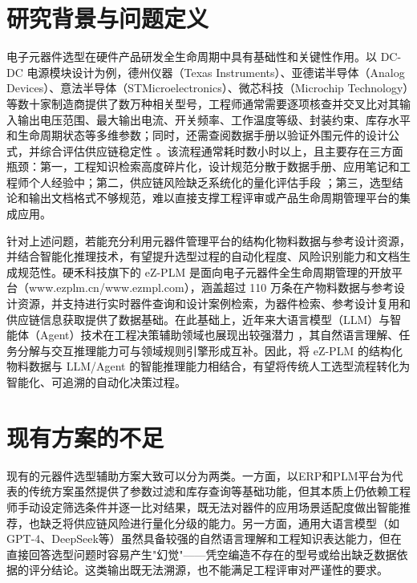 
\section{研究背景与问题定义}
电子元器件选型在硬件产品研发全生命周期中具有基础性和关键性作用。以 DC-DC 电源模块设计为例，德州仪器（Texas Instruments）、亚德诺半导体（Analog Devices）、意法半导体（STMicroelectronics）、微芯科技（Microchip Technology）等数十家制造商提供了数万种相关型号，工程师通常需要逐项核查并交叉比对其输入输出电压范围、最大输出电流、开关频率、工作温度等级、封装约束、库存水平和生命周期状态等多维参数；同时，还需查阅数据手册以验证外围元件的设计公式，并综合评估供应链稳定性 \cite{pecht2008parts}。该流程通常耗时数小时以上，且主要存在三方面瓶颈：第一，工程知识检索高度碎片化，设计规范分散于数据手册、应用笔记和工程师个人经验中；第二，供应链风险缺乏系统化的量化评估手段 \cite{chen2021supplyrisk}；第三，选型结论和输出文档格式不够规范，难以直接支撑工程评审或产品生命周期管理平台的集成应用。

针对上述问题，若能充分利用元器件管理平台的结构化物料数据与参考设计资源，并结合智能化推理技术，有望提升选型过程的自动化程度、风险识别能力和文档生成规范性。硬禾科技旗下的 eZ-PLM 是面向电子元器件全生命周期管理的开放平台（www.ezplm.cn/www.ezmpl.com），涵盖超过 110 万条在产物料数据与参考设计资源，并支持进行实时器件查询和设计案例检索，为器件检索、参考设计复用和供应链信息获取提供了数据基础。在此基础上，近年来大语言模型（LLM）与智能体（Agent）技术在工程决策辅助领域也展现出较强潜力 \cite{xi2023rise,li2023llmagent}，其自然语言理解、任务分解与交互推理能力可与领域规则引擎形成互补。因此，将 eZ-PLM 的结构化物料数据与 LLM/Agent 的智能推理能力相结合，有望将传统人工选型流程转化为智能化、可追溯的自动化决策过程。

\section{现有方案的不足}

现有的元器件选型辅助方案大致可以分为两类。一方面，以ERP和PLM平台为代表的传统方案虽然提供了参数过滤和库存查询等基础功能，但其本质上仍依赖工程师手动设定筛选条件并逐一比对结果，既无法对器件的应用场景适配度做出智能推荐，也缺乏将供应链风险进行量化分级的能力\cite{pecht2002electronic}。另一方面，通用大语言模型（如GPT-4、DeepSeek等）虽然具备较强的自然语言理解和工程知识表达能力，但在直接回答选型问题时容易产生"幻觉"——凭空编造不存在的型号或给出缺乏数据依据的评分结论\cite{wang2023survey}。这类输出既无法溯源，也不能满足工程评审对严谨性的要求。

